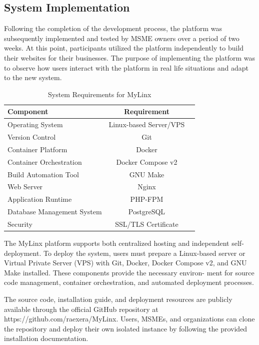 \documentclass[conference]{IEEEtran}
\begin{document}
\subsection{System Implementation}

Following the completion of the development process, the platform was subsequently implemented and tested by MSME owners over a period of two weeks. At this point, participants utilized the platform independently to build their websites for their businesses. The purpose of implementing the platform was to observe how users interact with the platform in real life situations and adapt to the new system.

\begin{table}[H]
\centering
\caption{System Requirements for MyLinx}
\label{tab:requirements}

\begin{tabular}{p{5cm}cc}
\hline
\textbf{Component} & \textbf{Requirement} \\
\hline
Operating System & Linux-based Server/VPS \\
Version Control & Git \\
Container Platform & Docker \\
Container Orchestration & Docker Compose v2 \\
Build Automation Tool & GNU Make \\
Web Server & Nginx \\
Application Runtime & PHP-FPM \\
Database Management System & PostgreSQL \\
Security & SSL/TLS Certificate \\
\hline
\end{tabular}

\end{table}
The MyLinx platform supports both centralized hosting and independent self-deployment. To deploy the system, users must prepare a Linux-based server or Virtual Private Server (VPS) with Git, Docker, Docker Compose v2, and GNU Make installed. These components provide the necessary environ- ment for source code management, container orchestration, and automated deployment processes.

The source code, installation guide, and deployment resources are publicly available through the official GitHub repository at https://github.com/raexera/MyLinx. Users, MSMEs, and organizations can clone the repository and deploy their own isolated instance by following the provided installation documentation.
\end{document}
